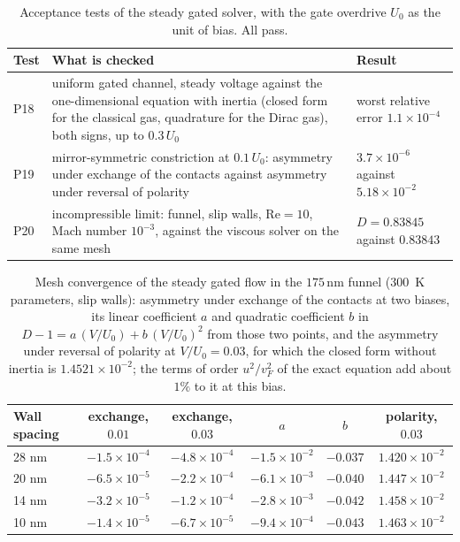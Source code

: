 \documentclass[aps,prapplied,onecolumn,superscriptaddress,floatfix]{revtex4-2}
\newcommand{\nm}{\,\mathrm{nm}}
\begin{document}
\begin{table}[ht]
\caption{Acceptance tests of the steady gated solver, with the gate
overdrive $U_{0}$ as the unit of bias. All pass.}
\begin{ruledtabular}
\begin{tabular}{lp{}p{}}
Test & What is checked & Result \\
\hline
P18 & uniform gated channel, steady voltage against the one-dimensional equation with inertia (closed form for the classical gas, quadrature for the Dirac gas), both signs, up to $0.3\,U_{0}$ & worst relative error $1.1\times10^{-4}$ \\
P19 & mirror-symmetric constriction at $0.1\,U_{0}$: asymmetry under exchange of the contacts against asymmetry under reversal of polarity & $3.7\times10^{-6}$ against $5.18\times10^{-2}$ \\
P20 & incompressible limit: funnel, slip walls, $\mathrm{Re}=10$, Mach number $10^{-3}$, against the viscous solver on the same mesh & $D=0.83845$ against $0.83843$ \\
\end{tabular}
\end{ruledtabular}
\end{table}

\begin{table}[ht]
\caption{Mesh convergence of the steady gated flow in the $175\nm$ funnel
($300$~K parameters, slip walls): asymmetry under exchange of the contacts
at two biases, its linear coefficient $a$ and quadratic coefficient $b$ in
$D-1=a\,(V/U_{0})+b\,(V/U_{0})^{2}$ from those two points, and the asymmetry
under reversal of polarity at $V/U_{0}=0.03$, for which the closed form
without inertia is $1.4521\times10^{-2}$; the terms of order
$u^{2}/v_{F}^{2}$ of the exact equation add about $1\%$ to it at this
bias.}
\label{tab:gatedmesh}
\begin{ruledtabular}
\begin{tabular}{lccccc}
Wall spacing & exchange, $0.01$ & exchange, $0.03$ & $a$ & $b$ & polarity, $0.03$ \\
\hline
28 nm & $-1.5\times10^{-4}$ & $-4.8\times10^{-4}$ & $-1.5\times10^{-2}$ & $-0.037$ & $1.420\times10^{-2}$ \\
20 nm & $-6.5\times10^{-5}$ & $-2.2\times10^{-4}$ & $-6.1\times10^{-3}$ & $-0.040$ & $1.447\times10^{-2}$ \\
14 nm & $-3.2\times10^{-5}$ & $-1.2\times10^{-4}$ & $-2.8\times10^{-3}$ & $-0.042$ & $1.458\times10^{-2}$ \\
10 nm & $-1.4\times10^{-5}$ & $-6.7\times10^{-5}$ & $-9.4\times10^{-4}$ & $-0.043$ & $1.463\times10^{-2}$ \\
\end{tabular}
\end{ruledtabular}
\end{table}
\end{document}

